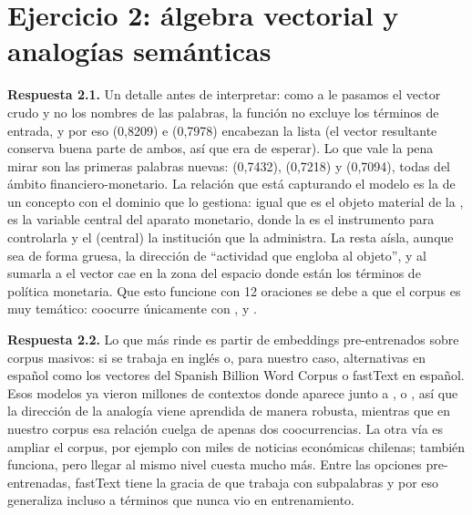 \section{Ejercicio 2: álgebra vectorial y analogías semánticas}

\textbf{Respuesta 2.1.} Un detalle antes de interpretar: como a  le pasamos el vector crudo y no los nombres de las palabras, la función no excluye los términos de entrada, y por eso  (0,8209) e  (0,7978) encabezan la lista (el vector resultante conserva buena parte de ambos, así que era de esperar). Lo que vale la pena mirar son las primeras palabras nuevas:  (0,7432),  (0,7218) y  (0,7094), todas del ámbito financiero-monetario. La relación que está capturando el modelo es la de un concepto con el dominio que lo gestiona: igual que  es el objeto material de la ,  es la variable central del aparato monetario, donde la  es el instrumento para controlarla y el  (central) la institución que la administra. La resta  aísla, aunque sea de forma gruesa, la dirección de ``actividad que engloba al objeto'', y al sumarla a  el vector cae en la zona del espacio donde están los términos de política monetaria. Que esto funcione con 12 oraciones se debe a que el corpus es muy temático:  coocurre únicamente con ,  y .

\textbf{Respuesta 2.2.} Lo que más rinde es partir de embeddings pre-entrenados sobre corpus masivos:  si se trabaja en inglés o, para nuestro caso, alternativas en español como los vectores del Spanish Billion Word Corpus o fastText en español. Esos modelos ya vieron millones de contextos donde  aparece junto a ,  o , así que la dirección de la analogía viene aprendida de manera robusta, mientras que en nuestro corpus esa relación cuelga de apenas dos coocurrencias. La otra vía es ampliar el corpus, por ejemplo con miles de noticias económicas chilenas; también funciona, pero llegar al mismo nivel cuesta mucho más. Entre las opciones pre-entrenadas, fastText tiene la gracia de que trabaja con subpalabras y por eso generaliza incluso a términos que nunca vio en entrenamiento.

